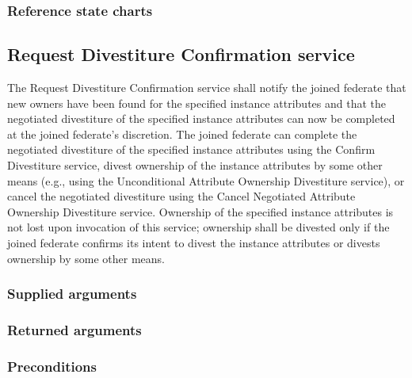 \begin{compactstdpage}

    \subsubsection{Reference state charts}



    \subsection{Request Divestiture Confirmation \rtiinitiated{} service}


    The Request Divestiture Confirmation \rtiinitiated{} service shall notify the joined federate that new owners have been found for the specified instance attributes and that the negotiated divestiture of the specified instance attributes can now be completed at the joined federate's discretion. The joined federate can complete the negotiated divestiture of the specified instance attributes using the Confirm Divestiture service, divest ownership of the instance attributes by some other means (e.g., using the Unconditional Attribute Ownership Divestiture service), or cancel the negotiated divestiture using the Cancel Negotiated Attribute Ownership Divestiture service. Ownership of the specified instance attributes is not lost upon invocation of this service; ownership shall be divested only if the joined federate confirms its intent to divest the instance attributes or divests ownership by some other means.

    \subsubsection{Supplied arguments}



    \subsubsection{Returned arguments}



    \subsubsection{Preconditions}



\end{compactstdpage}
